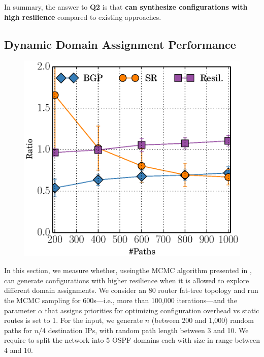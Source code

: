 \begin{figure}
	\centering
\end{figure}

In summary, the answer to \textbf{Q2} is that
\textbf{\name can synthesize configurations with high resilience} compared to existing approaches.


\subsection{Dynamic Domain Assignment Performance} \label{sec:mcmceval}
\begin{figure}
	\includegraphics[width=0.29\columnwidth]{figures/ratioMCMC.eps}
\end{figure}

In this section, we measure whether,
useingthe MCMC algorithm presented in , 
\name can 
generate configurations
with higher resilience when it is allowed to explore different domain assignments.
We consider an 80 router fat-tree topology and run the MCMC sampling
for 600s---i.e., more than 100,000 iterations---and the parameter
$\alpha$ that assigns priorities for optimizing configuration overhead
vs static routes is set to 1. For the input, we generate $n$ (between
200 and 1,000) random paths for $n/4$ destination IPs, with random
path length between 3 and 10.  We require \name to split the network
into 5 OSPF domains each with size in range between 4 and 10.

